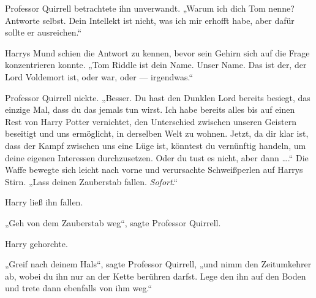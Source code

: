 Professor Quirrell betrachtete ihn unverwandt.
„Warum ich dich Tom nenne? Antworte selbst. Dein Intellekt ist nicht, was ich mir erhofft habe, aber dafür sollte er ausreichen.“

Harrys Mund schien die Antwort zu kennen, bevor sein Gehirn sich auf die Frage konzentrieren konnte.
„Tom Riddle ist dein Name. Unser Name. Das ist der, der Lord Voldemort ist, oder war, oder — irgendwas.“

Professor Quirrell nickte.
„Besser. Du hast den Dunklen Lord bereits besiegt, das einzige Mal, dass du das jemals tun wirst. Ich habe bereits alles bis auf einen Rest von Harry Potter vernichtet, den Unterschied zwischen unseren Geistern beseitigt und uns ermöglicht, in derselben Welt zu wohnen. Jetzt, da dir klar ist, dass der Kampf zwischen uns eine Lüge ist, könntest du vernünftig handeln, um deine eigenen Interessen durchzusetzen. Oder du tust es nicht, aber dann ….“ Die Waffe bewegte sich leicht nach vorne und verursachte Schweißperlen auf Harrys Stirn.
„Lass deinen Zauberstab fallen. \emph{Sofort}.“

Harry ließ ihn fallen.

„Geh von dem Zauberstab weg“, sagte Professor Quirrell.

Harry gehorchte.

„Greif nach deinem Hals“, sagte Professor Quirrell, „und nimm den Zeitumkehrer ab, wobei du ihn nur an der Kette berühren darfst. Lege den ihn auf den Boden und trete dann ebenfalls von ihm weg.“

